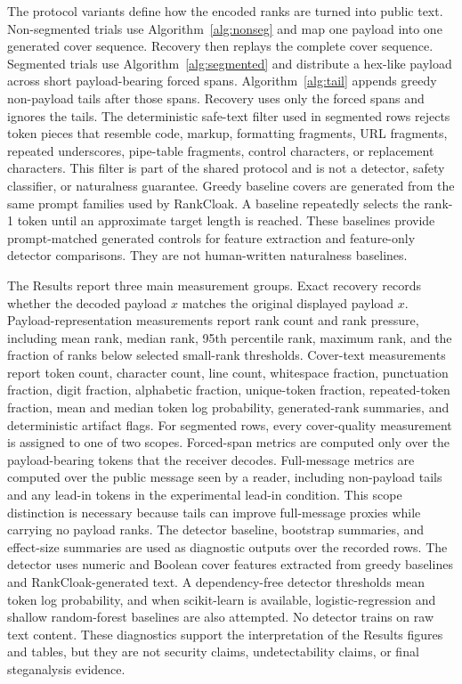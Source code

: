 \documentclass[fleqn,10pt]{wlscirep}
\begin{document}
The protocol variants define how the encoded ranks are turned into public text. Non-segmented trials use Algorithm~\ref{alg:nonseg} and map one payload into one generated cover sequence. Recovery then replays the complete cover sequence. Segmented trials use Algorithm~\ref{alg:segmented} and distribute a hex-like payload across short payload-bearing forced spans. Algorithm~\ref{alg:tail} appends greedy non-payload tails after those spans. Recovery uses only the forced spans and ignores the tails. The deterministic safe-text filter used in segmented rows rejects token pieces that resemble code, markup, formatting fragments, URL fragments, repeated underscores, pipe-table fragments, control characters, or replacement characters. This filter is part of the shared protocol and is not a detector, safety classifier, or naturalness guarantee.
Greedy baseline covers are generated from the same prompt families used by RankCloak. A baseline repeatedly selects the rank-1 token until an approximate target length is reached. These baselines provide prompt-matched generated controls for feature extraction and feature-only detector comparisons. They are not human-written naturalness baselines.

The Results report three main measurement groups. Exact recovery records whether the decoded payload \(\hat{x}\) matches the original displayed payload \(x\). Payload-representation measurements report rank count and rank pressure, including mean rank, median rank, 95th percentile rank, maximum rank, and the fraction of ranks below selected small-rank thresholds. Cover-text measurements report token count, character count, line count, whitespace fraction, punctuation fraction, digit fraction, alphabetic fraction, unique-token fraction, repeated-token fraction, mean and median token log probability, generated-rank summaries, and deterministic artifact flags.
For segmented rows, every cover-quality measurement is assigned to one of two scopes. Forced-span metrics are computed only over the payload-bearing tokens that the receiver decodes. Full-message metrics are computed over the public message seen by a reader, including non-payload tails and any lead-in tokens in the experimental lead-in condition. This scope distinction is necessary because tails can improve full-message proxies while carrying no payload ranks.
The detector baseline, bootstrap summaries, and effect-size summaries are used as diagnostic outputs over the recorded rows. The detector uses numeric and Boolean cover features extracted from greedy baselines and RankCloak-generated text. A dependency-free detector thresholds mean token log probability, and when scikit-learn is available, logistic-regression and shallow random-forest baselines are also attempted. No detector trains on raw text content. These diagnostics support the interpretation of the Results figures and tables, but they are not security claims, undetectability claims, or final steganalysis evidence.
\end{document}
